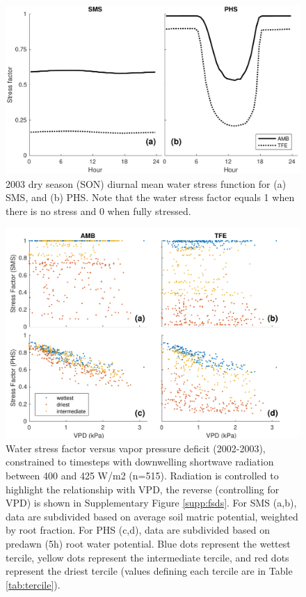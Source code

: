 \documentclass[draft,linenumbers]{agujournal}
\begin{document}
  
    \clearpage
    \begin{figure}[h]
     \centering
     \includegraphics[width=30pc]{figs/fig4.pdf}
     \caption{2003 dry season (SON) diurnal mean water stress function for 
     (a) SMS, and
     (b) PHS.
     Note that the water stress factor equals 1 when there is no stress and 0 when fully stressed.
     }
     \label{fig:stress1}
  \end{figure}
  
      \clearpage
    \begin{figure}[h]
     \centering
     \includegraphics[width=30pc]{figs/vpdstress.pdf}
     \caption{Water stress factor versus vapor pressure deficit (2002-2003), constrained to timesteps with downwelling shortwave radiation between 400 and 425 W/m2 (n=515).
     Radiation is controlled to highlight the relationship with VPD, the reverse (controlling for VPD) is shown in Supplementary Figure \ref{supp:fsds}.
     For SMS (a,b), data are subdivided based on average soil matric potential, weighted by root fraction.
     For PHS (c,d), data are subdivided based on predawn (5h) root water potential.
     Blue dots represent the wettest tercile, yellow dots represent the intermediate tercile, and red dots represent the driest tercile (values defining each tercile are in Table \ref{tab:tercile}).
     }
     \label{fig:stress2}
       \end{figure}
      
\end{document}
